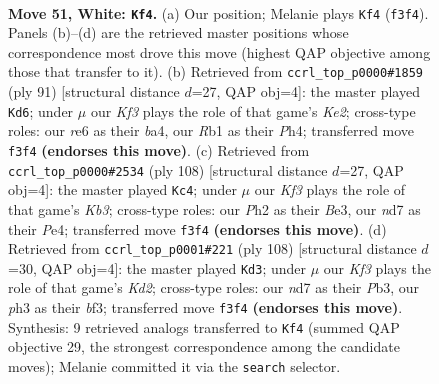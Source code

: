 \documentclass[11pt]{article}
\begin{document}
\clearpage

\begin{figure}[p]\centering
\begin{subfigure}{0.46\textwidth}\centering
\resizebox{\linewidth}{!}{%
\newchessgame
\chessboard[
  setfen={7k/3n4/4r3/8/p1p3P1/P1P2K1p/2P4P/BR6 w - - 7 51},
  showmover=false,
  pgfstyle=straightmove, color=movearrow, markmove={f3-f4}
]}
\caption{}
\end{subfigure}\hfill
\begin{subfigure}{0.46\textwidth}\centering
\resizebox{\linewidth}{!}{%
\newchessgame
\chessboard[
  setfen={8/4k3/4p1p1/4p3/B3P2p/2P3bP/4K1P1/8 b - - 4 46},
  showmover=false,
  pgfstyle=straightmove, color=movearrow, markmove={e7-d6}
]}
\caption{}
\end{subfigure}
\\[4pt]
\begin{subfigure}{0.46\textwidth}\centering
\resizebox{\linewidth}{!}{%
\newchessgame
\chessboard[
  setfen={2k5/8/p1p1n1p1/7p/P3P2P/1K2B1P1/1P6/8 w - - 7 55},
  showmover=false,
  pgfstyle=straightmove, color=movearrow, markmove={b3-c4}
]}
\caption{}
\end{subfigure}\hfill
\begin{subfigure}{0.46\textwidth}\centering
\resizebox{\linewidth}{!}{%
\newchessgame
\chessboard[
  setfen={6B1/6p1/1p1k1p2/p7/P4P1P/1PP2b2/3K4/8 w - - 11 55},
  showmover=false,
  pgfstyle=straightmove, color=movearrow, markmove={d2-d3}
]}
\caption{}
\end{subfigure}
\caption{\textbf{Move 51, White: \texttt{Kf4}.} (a) Our position; Melanie plays \texttt{Kf4} (\texttt{f3f4}). Panels (b)--(d) are the retrieved master positions whose correspondence most drove this move (highest QAP objective among those that transfer to it). (b) Retrieved from \texttt{ccrl\_top\_p0000\#1859} (ply 91) [structural distance $d$=27, QAP obj=4]: the master played \texttt{Kd6}; under $\mu$ our \emph{Kf3} plays the role of that game's \emph{Ke2}; cross-type roles: our \emph{r}e6 as their \emph{b}a4, our \emph{R}b1 as their \emph{P}h4; transferred move \texttt{f3f4} \textbf{(endorses this move)}. (c) Retrieved from \texttt{ccrl\_top\_p0000\#2534} (ply 108) [structural distance $d$=27, QAP obj=4]: the master played \texttt{Kc4}; under $\mu$ our \emph{Kf3} plays the role of that game's \emph{Kb3}; cross-type roles: our \emph{P}h2 as their \emph{B}e3, our \emph{n}d7 as their \emph{P}e4; transferred move \texttt{f3f4} \textbf{(endorses this move)}. (d) Retrieved from \texttt{ccrl\_top\_p0001\#221} (ply 108) [structural distance $d$=30, QAP obj=4]: the master played \texttt{Kd3}; under $\mu$ our \emph{Kf3} plays the role of that game's \emph{Kd2}; cross-type roles: our \emph{n}d7 as their \emph{P}b3, our \emph{p}h3 as their \emph{b}f3; transferred move \texttt{f3f4} \textbf{(endorses this move)}. Synthesis: 9 retrieved analogs transferred to \texttt{Kf4} (summed QAP objective 29, the strongest correspondence among the candidate moves); Melanie committed it via the \texttt{search} selector.}
\label{fig:thought-m100}
\end{figure}
\end{document}
